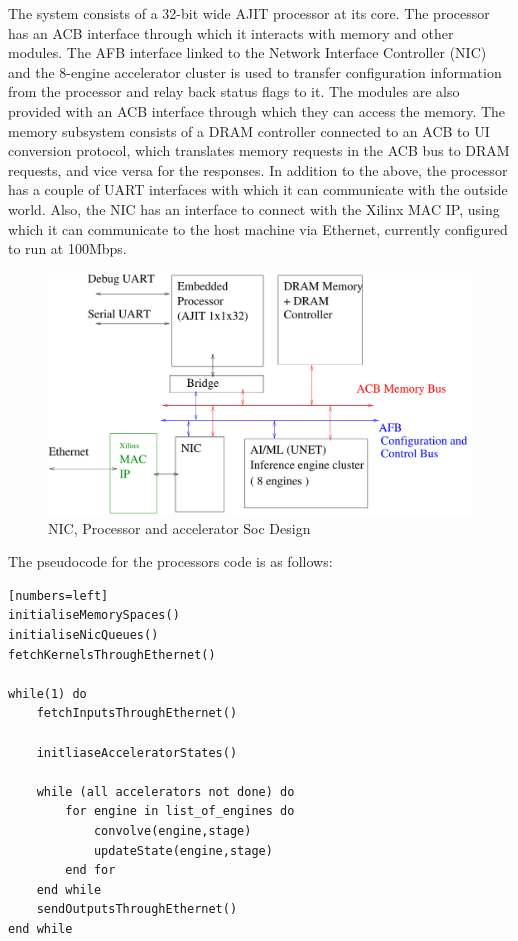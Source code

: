 \documentclass[12pt]{report}
\begin{document}
The system consists of a 32-bit wide AJIT processor at its core. The processor has an ACB interface through which it interacts with memory and other modules. The AFB interface linked to the Network Interface Controller (NIC) and the 8-engine accelerator cluster is used to transfer configuration information from the processor and relay back status flags to it. The modules are also provided with an ACB interface through which they can access the memory. The memory subsystem consists of a DRAM controller connected to an ACB to UI conversion protocol, which translates memory requests in the ACB bus to DRAM requests, and vice versa for the responses. In addition to the above, the processor has a couple of UART interfaces with which it can communicate with the outside world. Also, the NIC has an interface to connect with the Xilinx MAC IP, using which it can communicate to the host machine via Ethernet, currently configured to run at 100Mbps. 
\\
		\begin{figure}[h]
			\centering
			\includegraphics[width=12cm]{./figures/BlockDiagram.pdf}
			\caption{NIC, Processor and accelerator Soc Design}
			\label{fig:SoC}
		\end{figure}

		\clearpage
The pseudocode for the processors code is as follows:

\begin{verbatim}[numbers=left]
initialiseMemorySpaces()
initialiseNicQueues()
fetchKernelsThroughEthernet()

while(1) do
	fetchInputsThroughEthernet()
	
	initliaseAcceleratorStates()
	
	while (all accelerators not done) do
		for engine in list_of_engines do
			convolve(engine,stage)
			updateState(engine,stage)
		end for
	end while
	sendOutputsThroughEthernet()
end while
\end{verbatim}
\end{document}
